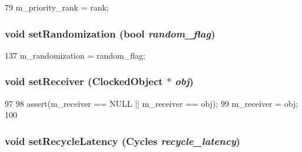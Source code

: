 \begin{DoxyCode}
79 { m_priority_rank = rank; }
\end{DoxyCode}
\hypertarget{classMessageBuffer_a746f6cbcd8fa14109bb37712f8dbd210}{
\subsubsection[{setRandomization}]{\setlength{\rightskip}{0pt plus 5cm}void setRandomization (bool {\em random\_\-flag})}}
\label{classMessageBuffer_a746f6cbcd8fa14109bb37712f8dbd210}



\begin{DoxyCode}
137 { m_randomization = random_flag; }
\end{DoxyCode}
\hypertarget{classMessageBuffer_a1fbc695c465cc14aeb497a623951ba6d}{
\subsubsection[{setReceiver}]{\setlength{\rightskip}{0pt plus 5cm}void setReceiver ({\bf ClockedObject} $\ast$ {\em obj})}}
\label{classMessageBuffer_a1fbc695c465cc14aeb497a623951ba6d}



\begin{DoxyCode}
97     {
98         assert(m_receiver == NULL || m_receiver == obj);
99         m_receiver = obj;
100     }
\end{DoxyCode}
\hypertarget{classMessageBuffer_ad9be4b0fe9efff18c2e56a1705d99918}{
\subsubsection[{setRecycleLatency}]{\setlength{\rightskip}{0pt plus 5cm}void setRecycleLatency ({\bf Cycles} {\em recycle\_\-latency})}}
\label{classMessageBuffer_ad9be4b0fe9efff18c2e56a1705d99918}



